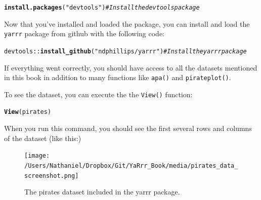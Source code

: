 \documentclass{tufte-book}\usepackage[]{graphicx}\usepackage[]{color}
\makeatletter
\newcommand{\hlstr}[1]{\textcolor[rgb]{0.192,0.494,0.8}{#1}}%
\newcommand{\hlcom}[1]{\textcolor[rgb]{0.678,0.584,0.686}{\textit{#1}}}%
\newcommand{\hlopt}[1]{\textcolor[rgb]{0,0,0}{#1}}%
\newcommand{\hlstd}[1]{\textcolor[rgb]{0.345,0.345,0.345}{#1}}%
\newcommand{\hlkwd}[1]{\textcolor[rgb]{0.737,0.353,0.396}{\textbf{#1}}}%
\newenvironment{kframe}{%
 \def\at@end@of@kframe{}%
 \ifinner\ifhmode%
  \def\at@end@of@kframe{\end{minipage}}%
  \begin{minipage}{\columnwidth}%
 \fi\fi%
 \def\FrameCommand##1{\hskip\@totalleftmargin \hskip-\fboxsep
 \colorbox{shadecolor}{##1}\hskip-\fboxsep
     \hskip-\linewidth \hskip-\@totalleftmargin \hskip\columnwidth}%
 \MakeFramed {\advance\hsize-\width
   \@totalleftmargin\z@ \linewidth\hsize
   \@setminipage}}%
 {\par\unskip\endMakeFramed%
 \at@end@of@kframe}
\newenvironment{knitrout}{}{} %
\makeatother
\begin{document}
\begin{knitrout}
\color{fgcolor}\begin{kframe}
\begin{alltt}
\hlkwd{install.packages}\hlstd{(}\hlstr{"devtools"}\hlstd{)} \hlcom{# Install the devtools package}
\end{alltt}
\end{kframe}
\end{knitrout}

Now that you've installed and loaded the  package, you can install and load the \texttt{yarrr} package from github with the following code:


\begin{knitrout}
\color{fgcolor}\begin{kframe}
\begin{alltt}
\hlstd{devtools}\hlopt{::}\hlkwd{install_github}\hlstd{(}\hlstr{"ndphillips/yarrr"}\hlstd{)} \hlcom{# Install the yarrr package}
\end{alltt}
\end{kframe}
\end{knitrout}



If everything went correctly, you should have access to all the datasets mentioned in this book in addition to many functions like \texttt{apa()} and \texttt{pirateplot()}.


To see the dataset, you can execute the the \texttt{View()} function:

\begin{knitrout}
\color{fgcolor}\begin{kframe}
\begin{alltt}
\hlkwd{View}\hlstd{(pirates)}
\end{alltt}
\end{kframe}
\end{knitrout}

When you run this command, you should see the first several rows and columns of the dataset (like this:)

\begin{figure}
\texttt{[image: /Users/Nathaniel/Dropbox/Git/YaRrr\_Book/media/pirates\_data\_screenshot.png]}
\caption{The pirates dataset included in the yarrr package.}
\label{fig:piratesdata}
\end{figure}
\end{document}
